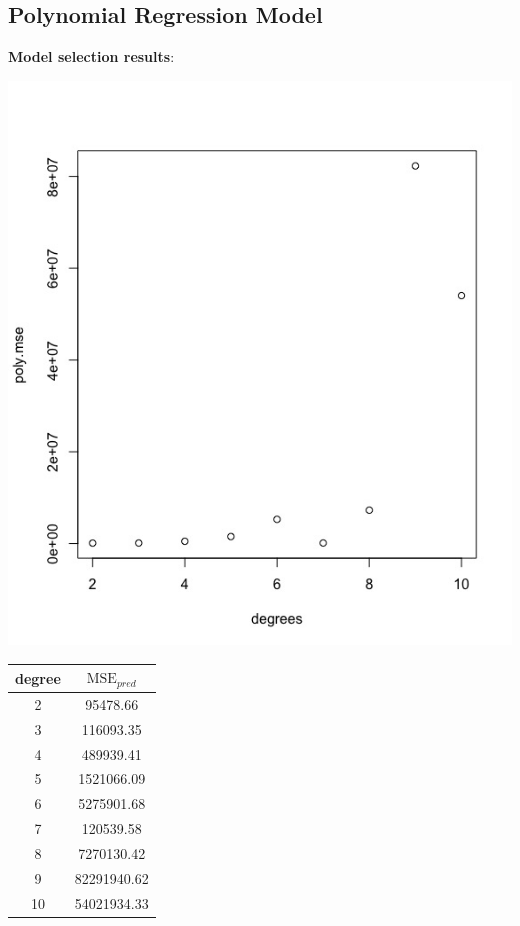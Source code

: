\documentclass[paper=letter, fontsize=11pt]{scrartcl}
\begin{document}
\subsection{Polynomial Regression Model}
\label{app:poly_summary}

\textbf{Model selection results}:

\begin{minipage}{\textwidth}
  \begin{minipage}[b]{0.49\textwidth}
    \centering
    \includegraphics[width=0.75\linewidth]{Image/poly-test-mse.jpeg}
    \label{fig:reg_test_mse}
  \end{minipage}
  \hfill
  \begin{minipage}[b]{0.49\textwidth}
    \centering
    \begin{tabular}{|c|c|}
    \hline
    degree &  $\mathrm{MSE}_{pred}$ \\
    \hline\hline
    2  &  95478.66 \\
    3 & 116093.35 \\
    4 &  489939.41 \\
    5 & 1521066.09 \\
    6 & 5275901.68 \\
    7  & 120539.58 \\
    8 & 7270130.42 \\
    9 & 82291940.62 \\
    10 &  54021934.33 \\
    \hline
    \end{tabular}
    \label{tab:reg_test_mse}
    \end{minipage}
\end{minipage}
\end{document}
